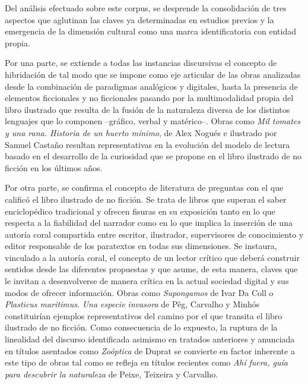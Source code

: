 \documentclass[spanish]{textolivre}
\begin{document}
Del análisis efectuado sobre este corpus, se desprende la consolidación de tres aspectos que aglutinan las claves ya determinadas en estudios previos \cite{grilli_non-fiction_2020a,tabernero__2022} y la emergencia de la dimensión cultural como una marca identificatoria con entidad propia.

Por una parte, se extiende a todas las instancias discursivas el concepto de hibridación de tal modo que se impone como eje articular de las obras analizadas desde la combinación de paradigmas analógicos y digitales, hasta la presencia de elementos ficcionales y no ficcionales pasando por la multimodalidad propia del libro ilustrado que resulta de la fusión de la naturaleza diversa de los distintos lenguajes que lo componen --gráfico, verbal y matérico--. Obras como \textit{Mil tomates y una rana. Historia de un huerto mínimo}, de Alex Nogués e ilustrado por Samuel Castaño resultan representativas en la evolución del modelo de lectura basado en el desarrollo de la curiosidad que se propone en el libro ilustrado de no ficción en los últimos años.

Por otra parte, se confirma el concepto de literatura de preguntas con el que \textcite{sanders_literature_2017} calificó el libro ilustrado de no ficción. Se trata de libros que superan el saber enciclopédico tradicional y ofrecen fisuras en su exposición tanto en lo que respecta a la fiabilidad del narrador como en lo que implica la inserción de una autoría coral compartida entre escritor, ilustrador, supervisores de conocimiento y editor responsable de los paratextos en todas sus dimensiones. Se instaura, vinculado a la autoría coral, el concepto de un lector crítico que deberá construir sentidos desde las diferentes propuestas y que asume, de esta manera, claves que le invitan a desenvolverse de manera crítica en la actual sociedad digital y sus modos de ofrecer información. Obras como \textit{Supongamos} de Ivar Da Coll o \textit{Plasticus maritimus}. \textit{Una especie invasora} de Pêg, Carvalho y Minhós constituirían ejemplos representativos del camino por el que transita el libro ilustrado de no ficción. Como consecuencia de lo expuesto, la ruptura de la linealidad del discurso identificada asimismo en tratados anteriores \cite{tabernero__2022} y anunciada en títulos asentados como \textit{Zoóptica} de Duprat se convierte en factor inherente a este tipo de obras tal como se refleja en títulos recientes como \textit{Ahí fuera, guía para descubrir la naturaleza} de Peixe, Teixeira y Carvalho.
\end{document}
